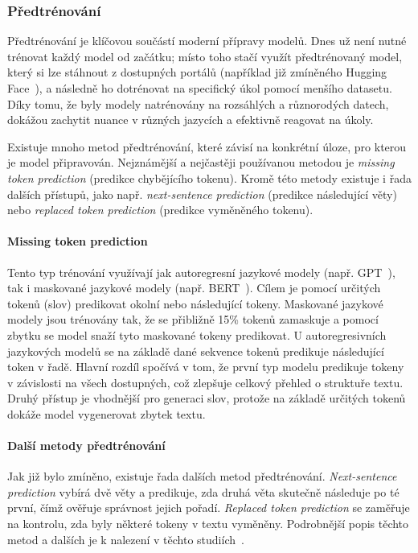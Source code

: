 \subsubsection{Předtrénování}\label{predtrenovani}
Předtrénování je klíčovou součástí moderní přípravy modelů. Dnes už není nutné trénovat každý model od začátku; místo toho stačí využít předtrénovaný model, který si lze stáhnout z dostupných portálů (například již zmíněného Hugging Face~\cite{huggingface}), a následně ho dotrénovat na specifický úkol pomocí menšího datasetu. Díky tomu, že byly modely natrénovány na rozsáhlých a různorodých datech, dokážou zachytit nuance v různých jazycích a efektivně reagovat na úkoly.

Existuje mnoho metod předtrénování, které závisí na konkrétní úloze, pro kterou je model připravován. Nejznámější a nejčastěji používanou metodou je \emph{missing token prediction} (predikce chybějícího tokenu). Kromě této metody existuje i řada dalších přístupů, jako např. \emph{next-sentence prediction} (predikce následující věty) nebo \emph{replaced token prediction} (predikce vyměněného tokenu).~\cite{Wei_2024, zhou2023comprehensivesurveypretrainedfoundation}

\paragraph{Missing token prediction}
Tento typ trénování využívají jak autoregresní jazykové modely (např. GPT~\cite{radford2018improving}), tak i maskované jazykové modely (např. BERT~\cite{devlin2019bert}). Cílem je pomocí určitých tokenů (slov) predikovat okolní nebo následující tokeny. Maskované jazykové modely jsou trénovány tak, že se přibližně 15\% tokenů zamaskuje a pomocí zbytku se model snaží tyto maskované tokeny predikovat. U autoregresivních jazykových modelů se na základě dané sekvence tokenů predikuje následující token v řadě. Hlavní rozdíl spočívá v tom, že první typ modelu predikuje tokeny v závislosti na všech dostupných, což zlepšuje celkový přehled o struktuře textu. Druhý přístup je vhodnější pro generaci slov, protože na základě určitých tokenů dokáže model vygenerovat zbytek textu.~\cite{Wei_2024, min2021recentadvancesnaturallanguage}

\paragraph{Další metody předtrénování}
Jak již bylo zmíněno, existuje řada dalších metod předtrénování. \emph{Next-sentence prediction} vybírá dvě věty a predikuje, zda druhá věta skutečně následuje po té první, čímž ověřuje správnost jejich pořadí. \emph{Replaced token prediction} se zaměřuje na kontrolu, zda byly některé tokeny v textu vyměněny. Podrobnější popis těchto metod a dalších je k nalezení v těchto studiích~\cite{Wei_2024, zhou2023comprehensivesurveypretrainedfoundation}.

